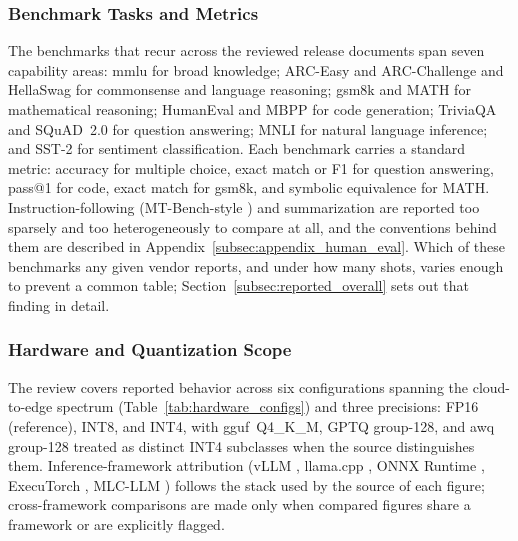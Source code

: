 \subsubsection{Benchmark Tasks and Metrics}
\label{subsec:reported_benchmarks}
The benchmarks that recur across the reviewed release documents span seven
capability areas: \gls{mmlu} \citep{hendrycks2021mmlu} for broad knowledge;
ARC-Easy and ARC-Challenge \citep{clark2018arc} and HellaSwag
\citep{zellers2019hellaswag} for commonsense and language reasoning; \gls{gsm8k}
\citep{cobbe2021gsm8k} and MATH \citep{hendrycks2021math} for mathematical
reasoning; HumanEval \citep{chen2021humaneval} and MBPP \citep{austin2021mbpp}
for code generation; TriviaQA \citep{joshi2017triviaqa} and SQuAD~2.0
\citep{rajpurkar2018squad2} for question answering; MNLI \citep{williams2018mnli}
for natural language inference; and SST-2 \citep{socher2013sst} for sentiment
classification. Each benchmark carries a standard metric: accuracy for multiple
choice, exact match or F1 for question answering, pass@1 for code, exact match
for \gls{gsm8k}, and symbolic equivalence for MATH. Instruction-following
(MT-Bench-style \citep{zheng2023mtbench}) and summarization are reported too
sparsely and too heterogeneously to compare at all, and the conventions behind
them are described in Appendix~\ref{subsec:appendix_human_eval}. Which of these
benchmarks any given vendor reports, and under how many shots, varies enough to
prevent a common table; Section~\ref{subsec:reported_overall} sets out that
finding in detail.

\subsubsection{Hardware and Quantization Scope}
\label{subsec:reported_hardware}
The review covers reported behavior across six configurations spanning the
cloud-to-edge spectrum (Table~\ref{tab:hardware_configs}) and three precisions:
FP16 (reference), INT8, and INT4, with \gls{gguf}~Q4\_K\_M, GPTQ group-128, and \gls{awq}
group-128 treated as distinct INT4 subclasses when the source distinguishes them.
Inference-framework attribution (vLLM \citep{kwon2023vllm}, llama.cpp
\citep{gerganov2023llamacpp}, ONNX Runtime \citep{microsoft2019onnx}, ExecuTorch
\citep{meta2024executorch}, MLC-LLM \citep{mlc2024}) follows the stack used by the
source of each figure; cross-framework comparisons are made only when compared
figures share a framework or are explicitly flagged.

